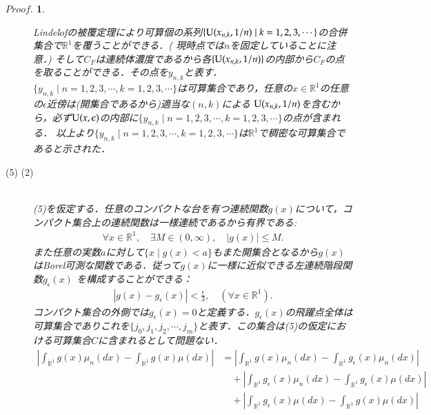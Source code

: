 \documentclass[a4j,papersize,disablejfam,slide,14pt]{jsarticle}
\newtheorem{Proof}{$Proof.$}
\begin{document}
\begin{Proof}
\begin{description}
                {\rm Lindel$\ddot{o}$f}の被覆定理により可算個の系列$\{{\rm U}(x_{n,k}, 1/n) \mid k=1,2,3,\cdots\}$の合併集合で$\mathbb{R}^1$を覆うことができる．(
                現時点では$n$を固定していることに注意．)
                そして$C_F$は連続体濃度であるから各$\{{\rm U}(x_{n,k}, 1/n)\}$の内部から$C_F$の点を取ることができる．その点を$y_{n,k}$と表す．
                $\{y_{n,k} \mid n=1,2,3,\cdots, k=1,2,3,\cdots\}$は可算集合であり，任意の$x \in \mathbb{R}^1$の任意の$\epsilon$近傍は(開集合であるから)適当な$(n,k)$による
                ${\rm U}(x_{n,k}, 1/n)$を含むから，必ず${\rm U}(x, \epsilon)$の内部に$\{y_{n,k} \mid n=1,2,3,\cdots, k=1,2,3,\cdots\}$の点が含まれる．
                以上より$\{y_{n,k} \mid n=1,2,3,\cdots, k=1,2,3,\cdots\}$は$\mathbb{R}^1$で稠密な可算集合であると示された．
            \item[{\large (5) \to (2)}]\mbox{}\\
            	(5)を仮定する．任意のコンパクトな台を有つ連続関数$g(x)$について，コンパクト集合上の連続関数は一様連続であるから有界である:
                \begin{align}
                	\forall x \in \mathbb{R}^1,\quad \exists M \in (0, \infty),\quad |g(x)| \leq M.
                \end{align}
                また任意の実数$a$に対して$\{x \mid g(x) < a\}$もまた開集合となるから$g(x)$は{\rm Borel}可測な関数である．従って$g(x)$に一様に近似できる左連続階段関数$g_\epsilon(x)$
                を構成することができる：
                \begin{align}
                	|g(x) - g_\epsilon(x)| < \frac{\epsilon}{3}, \quad (\forall x \in \mathbb{R}^1).
                \end{align}
                コンパクト集合の外側では$g_\epsilon(x)=0$と定義する．$g_\epsilon(x)$の飛躍点全体は可算集合でありこれを$\{ j_0, j_1, j_2, \cdots, j_m \}$と表す．この集合は(5)の仮定における可算集合$C$に含まれるとして問題ない．
                \begin{align}
                	\left| \int_{\mathbb{R}^1} g(x) \mu_n(dx) - \int_{\mathbb{R}^1} g(x) \mu(dx) \right| 
                    &= \left| \int_{\mathbb{R}^1} g(x) \mu_n(dx) - \int_{\mathbb{R}^1} g_\epsilon(x) \mu_n(dx) \right| \\
                    	&\quad+ \left| \int_{\mathbb{R}^1} g_\epsilon(x) \mu_n(dx) - \int_{\mathbb{R}^1} g_\epsilon(x) \mu(dx) \right| \\
                        &\quad+ \left| \int_{\mathbb{R}^1} g_\epsilon(x) \mu(dx) - \int_{\mathbb{R}^1} g(x) \mu(dx) \right| \\

\end{align}
\end{description}
\end{Proof}
\end{document}
